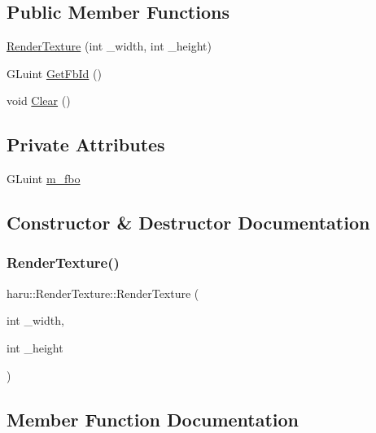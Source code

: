 \subsection*{Public Member Functions}
\begin{DoxyCompactItemize}
\item 
\mbox{\hyperlink{classharu_1_1_render_texture_a4b28ec612c35cbfa80f3205511351e7a}{Render\+Texture}} (int \+\_\+width, int \+\_\+height)
\item 
G\+Luint \mbox{\hyperlink{classharu_1_1_render_texture_acafa41032f3c155504d130c5ae43600b}{Get\+Fb\+Id}} ()
\item 
void \mbox{\hyperlink{classharu_1_1_render_texture_a923dfcb8a68d98c258de7f795a822721}{Clear}} ()
\end{DoxyCompactItemize}
\subsection*{Private Attributes}
\begin{DoxyCompactItemize}
\item 
G\+Luint \mbox{\hyperlink{classharu_1_1_render_texture_aa41c747cc61bf1c34fa64422cfdacc8c}{m\+\_\+fbo}}
\end{DoxyCompactItemize}


\subsection{Constructor \& Destructor Documentation}
\mbox{\label{classharu_1_1_render_texture_a4b28ec612c35cbfa80f3205511351e7a}} 
\subsubsection{\texorpdfstring{Render\+Texture()}{RenderTexture()}}
{\footnotesize\ttfamily haru\+::\+Render\+Texture\+::\+Render\+Texture (\begin{DoxyParamCaption}\item[{int}]{\+\_\+width,  }\item[{int}]{\+\_\+height }\end{DoxyParamCaption})}



\subsection{Member Function Documentation}
\mbox{\label{classharu_1_1_render_texture_a923dfcb8a68d98c258de7f795a822721}} 
